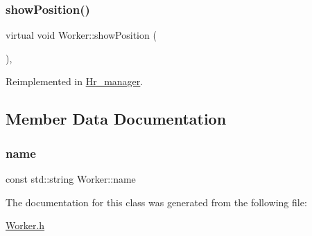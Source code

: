 \subsubsection{\texorpdfstring{show\+Position()}{showPosition()}}
{\footnotesize\ttfamily virtual void Worker\+::show\+Position (\begin{DoxyParamCaption}{ }\end{DoxyParamCaption})\hspace{0.3cm}{\ttfamily [inline]}, {\ttfamily [virtual]}}



Reimplemented in \hyperlink{class_hr__manager_a760e884af11ec93a1dbf3769cdf34adf}{Hr\+\_\+manager}.



\subsection{Member Data Documentation}
\hypertarget{class_worker_ae12c171804249dd8dfdb9588325c8f85}{}\label{class_worker_ae12c171804249dd8dfdb9588325c8f85} 
\subsubsection{\texorpdfstring{name}{name}}
{\footnotesize\ttfamily const std\+::string Worker\+::name\hspace{0.3cm}{\ttfamily [protected]}}



The documentation for this class was generated from the following file\+:\begin{DoxyCompactItemize}
\item 
\hyperlink{_worker_8h}{Worker.\+h}\end{DoxyCompactItemize}
